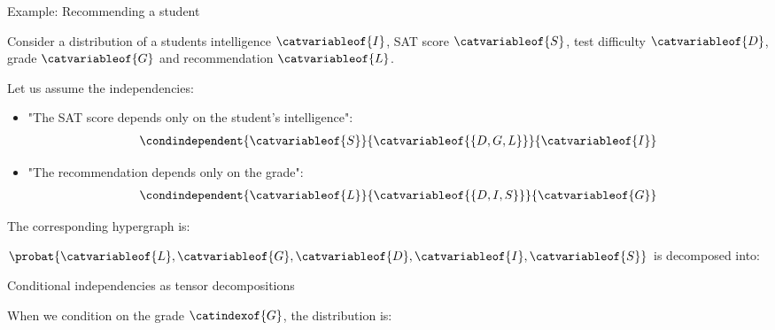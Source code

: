 \documentclass{beamer}
\begin{document}
    \begin{frame}{Example: Recommending a student}

        Consider a distribution of a students intelligence $\catvariableof{I}$, SAT score $\catvariableof{S}$, test difficulty $\catvariableof{D}$, grade $\catvariableof{G}$ and recommendation $\catvariableof{L}$.
        \begin{minipage}{0.5\linewidth}
            Let us assume the independencies:
            \begin{itemize}
                \item "The SAT score depends only on the student's intelligence":
                \begin{align*}
                    \condindependent{\catvariableof{S}}{\catvariableof{\{D,G,L\}}}{\catvariableof{I}}
                \end{align*}
                \item "The recommendation depends only on the grade":
                \begin{align*}
                    \condindependent{\catvariableof{L}}{\catvariableof{\{D,I,S\}}}{\catvariableof{G}}
                \end{align*}
            \end{itemize}
        \end{minipage}
        \begin{minipage}{0.45\linewidth}
            The corresponding hypergraph is:
            \begin{center}
                
            \end{center}
            $\probat{\catvariableof{L},\catvariableof{G},\catvariableof{D},\catvariableof{I},\catvariableof{S}}$ is decomposed into:
            \begin{center}
                
            \end{center}
        \end{minipage}


    \end{frame}


    \begin{frame}{Conditional independencies as tensor decompositions}

        When we condition on the grade $\catindexof{G}$, the distribution is:

        \begin{center}
            
        \end{center}


    \end{frame}
\end{document}
